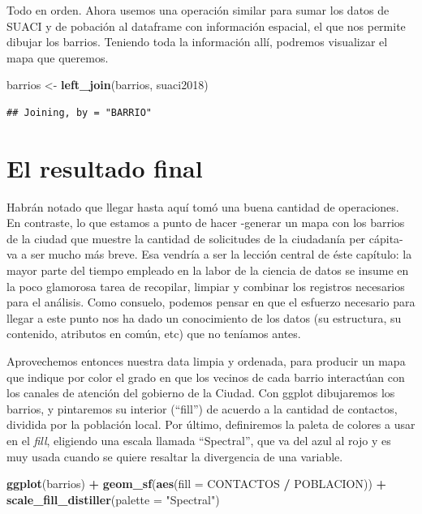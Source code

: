 \documentclass[]{book}
\newenvironment{Shaded}{\begin{snugshade}}{\end{snugshade}}
\newcommand{\KeywordTok}[1]{\textcolor[rgb]{0.13,0.29,0.53}{\textbf{#1}}}
\newcommand{\DataTypeTok}[1]{\textcolor[rgb]{0.13,0.29,0.53}{#1}}
\newcommand{\StringTok}[1]{\textcolor[rgb]{0.31,0.60,0.02}{#1}}
\newcommand{\OperatorTok}[1]{\textcolor[rgb]{0.81,0.36,0.00}{\textbf{#1}}}
\newcommand{\NormalTok}[1]{#1}
\begin{document}
Todo en orden. Ahora usemos una operación similar para sumar los datos
de SUACI y de pobación al dataframe con información espacial, el que nos
permite dibujar los barrios. Teniendo toda la información allí, podremos
visualizar el mapa que queremos.

\begin{Shaded}
\begin{Highlighting}[]
\NormalTok{barrios <-}\StringTok{ }\KeywordTok{left_join}\NormalTok{(barrios, suaci2018)}
\end{Highlighting}
\end{Shaded}

\begin{verbatim}
## Joining, by = "BARRIO"
\end{verbatim}

\section{El resultado final}\label{el-resultado-final}

Habrán notado que llegar hasta aquí tomó una buena cantidad de
operaciones. En contraste, lo que estamos a punto de hacer -generar un
mapa con los barrios de la ciudad que muestre la cantidad de solicitudes
de la ciudadanía per cápita- va a ser mucho más breve. Esa vendría a ser
la lección central de éste capítulo: la mayor parte del tiempo empleado
en la labor de la ciencia de datos se insume en la poco glamorosa tarea
de recopilar, limpiar y combinar los registros necesarios para el
análisis. Como consuelo, podemos pensar en que el esfuerzo necesario
para llegar a este punto nos ha dado un conocimiento de los datos (su
estructura, su contenido, atributos en común, etc) que no teníamos
antes.

Aprovechemos entonces nuestra data limpia y ordenada, para producir un
mapa que indique por color el grado en que los vecinos de cada barrio
interactúan con los canales de atención del gobierno de la Ciudad. Con
ggplot dibujaremos los barrios, y pintaremos su interior (``fill'') de
acuerdo a la cantidad de contactos, dividida por la población local. Por
último, definiremos la paleta de colores a usar en el \emph{fill},
eligiendo una escala llamada ``Spectral'', que va del azul al rojo y es
muy usada cuando se quiere resaltar la divergencia de una variable.

\begin{Shaded}
\begin{Highlighting}[]
\KeywordTok{ggplot}\NormalTok{(barrios) }\OperatorTok{+}
\StringTok{    }\KeywordTok{geom_sf}\NormalTok{(}\KeywordTok{aes}\NormalTok{(}\DataTypeTok{fill =}\NormalTok{ CONTACTOS }\OperatorTok{/}\StringTok{ }\NormalTok{POBLACION)) }\OperatorTok{+}
\StringTok{    }\KeywordTok{scale_fill_distiller}\NormalTok{(}\DataTypeTok{palette =} \StringTok{"Spectral"}\NormalTok{)}
\end{Highlighting}
\end{Shaded}
\end{document}
